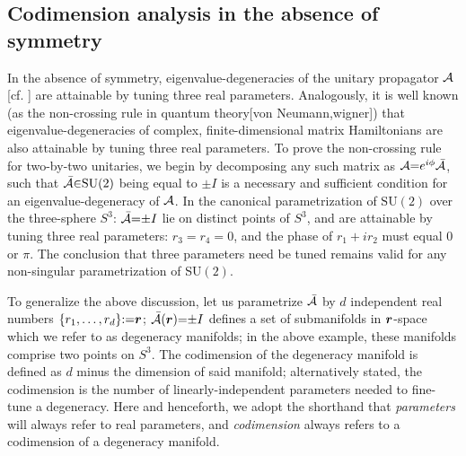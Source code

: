 \documentclass[aps, prb, showpacs, twocolumn, notitlepage, superscriptaddress]{revtex4-1}
\begin{document}

\subsection{Codimension analysis in the absence of symmetry}


In the absence of symmetry,  eigenvalue-degeneracies of the unitary propagator ${\cal A}$ [cf. ] are attainable by tuning three real parameters. Analogously, it is well known (as the non-crossing rule in quantum theory[von Neumann,wigner]) that eigenvalue-degeneracies of complex, finite-dimensional matrix Hamiltonians are also attainable by tuning three real parameters.
 To prove the non-crossing rule for two-by-two unitaries, we begin by decomposing any such matrix as ${\cal A}{=}e^{i\phi}{\cal \bar{A}}$, such that  ${\cal \bar{A}}{\in}\text{SU}(2)$ being equal to $\pm I$ is a necessary and sufficient condition for an eigenvalue-degeneracy of ${\cal A}$. In the canonical parametrization of $\text{SU}(2)$ over the three-sphere $S^3$: 
${\cal \bar{A}}{=}{\pm}I$ lie on distinct points of $S^3$, and are attainable by tuning three real parameters: $r_3{=}r_4{=}0$, and the phase of $r_1{+}ir_2$ must equal $0$ or $\pi$. The conclusion that three parameters need be tuned remains valid for any  non-singular parametrization of SU$(2)$.


 
 
 To generalize the above discussion, let us parametrize ${\cal \bar{A}}$ by $d$ independent real numbers  $\{r_1,\ldots,r_{d}\}{:}{=}\boldsymbol{r} $;  ${\cal \bar{A}}(\boldsymbol{r}){=}{\pm}I$ defines a set of submanifolds in $\boldsymbol{r}$-space which we refer to as degeneracy manifolds; in the above example, these manifolds comprise two points on $S^3$. The codimension of the degeneracy manifold  is defined as $d$ minus the dimension of said manifold; alternatively stated, the codimension is the number of linearly-independent parameters needed to fine-tune a degeneracy. Here and henceforth, we adopt the shorthand that  \textit{parameters} will always refer to real parameters, and \textit{codimension} always refers to a codimension of a degeneracy manifold. 
\end{document}

